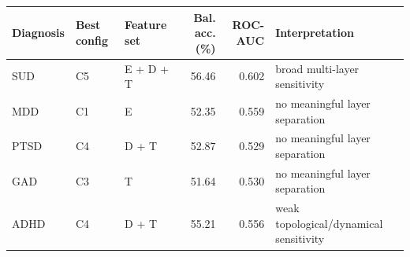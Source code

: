 \begin{tabular}{lllrrl}
\hline
Diagnosis & Best config & Feature set & Bal. acc. (\%) & ROC-AUC & Interpretation \\
\hline
SUD & C5 & E + D + T & 56.46 & 0.602 & broad multi-layer sensitivity \\
MDD & C1 & E & 52.35 & 0.559 & no meaningful layer separation \\
PTSD & C4 & D + T & 52.87 & 0.529 & no meaningful layer separation \\
GAD & C3 & T & 51.64 & 0.530 & no meaningful layer separation \\
ADHD & C4 & D + T & 55.21 & 0.556 & weak topological/dynamical sensitivity \\
\hline
\end{tabular}
